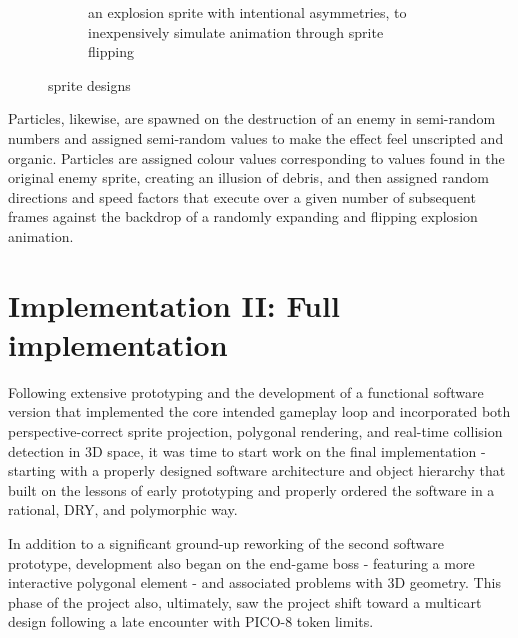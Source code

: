 \documentclass{article}
\begin{document}
\begin{figure}[h]
\begin{subfigure}{.45\textwidth}
  \caption{an explosion sprite with intentional asymmetries, to inexpensively simulate animation through sprite flipping}
  \label{fig:explosion_sprite}
\end{subfigure}\hfill
\caption{sprite designs}
\label{fig:sprites}
\end{figure}

Particles, likewise, are spawned on the destruction of an enemy in semi-random numbers and assigned semi-random
values to make the effect feel unscripted and organic. Particles are assigned colour values corresponding to
values found in the original enemy sprite, creating an illusion of debris, and then assigned random directions
and speed factors that execute over a given number of subsequent frames against the backdrop of a randomly
expanding and flipping explosion animation.


\section{Implementation II: Full implementation}

Following extensive prototyping and the development of a functional software version that
implemented the core intended gameplay loop and incorporated both perspective-correct sprite projection,
polygonal rendering, and real-time collision detection in 3D space, it was time to start work on
the final implementation - starting with a properly designed software architecture and object
hierarchy that built on the lessons of early prototyping and properly ordered the software in
a rational, DRY, and polymorphic way.

In addition to a significant ground-up reworking of the second software prototype, development
also began on the end-game boss - featuring a more interactive polygonal element - and associated
problems with 3D geometry. This phase of the project also, ultimately, saw the project shift toward
a multicart design following a late encounter with PICO-8 token limits.
\end{document}
